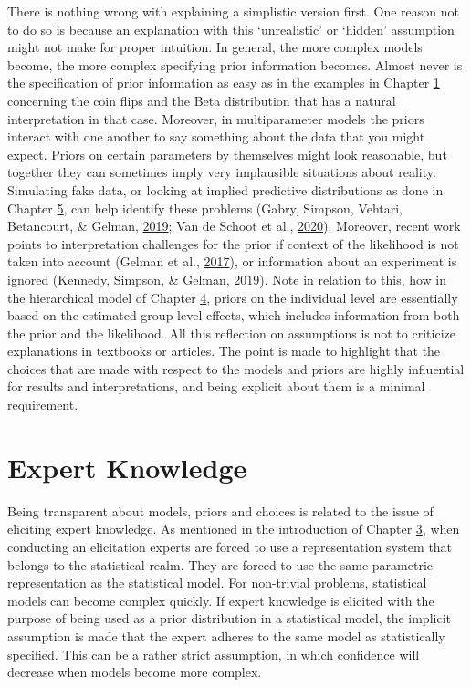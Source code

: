 \documentclass[openright,titlepage,12pt,a4paper]{book}
\begin{document}
There is nothing wrong with explaining a simplistic version first. One reason not to do so is because an explanation with this `unrealistic' or `hidden' assumption might not make for proper intuition. In general, the more complex models become, the more complex specifying prior information becomes. Almost never is the specification of prior information as easy as in the examples in Chapter \protect\hyperlink{introduction}{1} concerning the coin flips and the Beta distribution that has a natural interpretation in that case. Moreover, in multiparameter models the priors interact with one another to say something about the data that you might expect. Priors on certain parameters by themselves might look reasonable, but together they can sometimes imply very implausible situations about reality. Simulating fake data, or looking at implied predictive distributions as done in Chapter \protect\hyperlink{Burns}{5}, can help identify these problems (Gabry, Simpson, Vehtari, Betancourt, \& Gelman, \protect\hyperlink{ref-gabry_visualization_2019}{2019}; Van de Schoot et al., \protect\hyperlink{ref-van_de_schoot_tutorial_2020}{2020}). Moreover, recent work points to interpretation challenges for the prior if context of the likelihood is not taken into account (Gelman et al., \protect\hyperlink{ref-gelman_prior_2017}{2017}), or information about an experiment is ignored (Kennedy, Simpson, \& Gelman, \protect\hyperlink{ref-kennedy_experiment_2019}{2019}). Note in relation to this, how in the hierarchical model of Chapter \protect\hyperlink{Hierarchical}{4}, priors on the individual level are essentially based on the estimated group level effects, which includes information from both the prior and the likelihood. All this reflection on assumptions is not to criticize explanations in textbooks or articles. The point is made to highlight that the choices that are made with respect to the models and priors are highly influential for results and interpretations, and being explicit about them is a minimal requirement.

\hypertarget{expert-knowledge}{%
\section{Expert Knowledge}\label{expert-knowledge}}

Being transparent about models, priors and choices is related to the issue of eliciting expert knowledge. As mentioned in the introduction of Chapter \protect\hyperlink{DAC1}{3}, when conducting an elicitation experts are forced to use a representation system that belongs to the statistical realm. They are forced to use the same parametric representation as the statistical model. For non-trivial problems, statistical models can become complex quickly. If expert knowledge is elicited with the purpose of being used as a prior distribution in a statistical model, the implicit assumption is made that the expert adheres to the same model as statistically specified. This can be a rather strict assumption, in which confidence will decrease when models become more complex.
\end{document}
